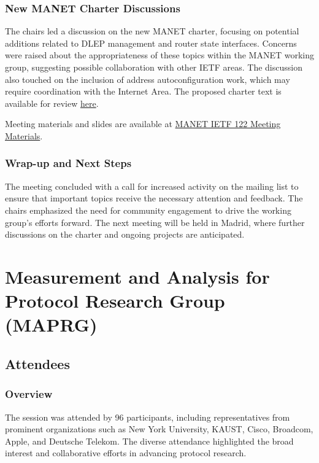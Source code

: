 \documentclass{article}
\begin{document}
\subsubsection{New MANET Charter Discussions}
The chairs led a discussion on the new MANET charter, focusing on potential additions related to DLEP management and router state interfaces. Concerns were raised about the appropriateness of these topics within the MANET working group, suggesting possible collaboration with other IETF areas. The discussion also touched on the inclusion of address autoconfiguration work, which may require coordination with the Internet Area. The proposed charter text is available for review \href{https://datatracker.ietf.org/meeting/122/materials/slides-122-manet-draft-charter-text-ietf-122-01}{here}.

Meeting materials and slides are available at \href{https://datatracker.ietf.org/meeting/122/materials/slides-122-manet-chair-slides-00}{MANET IETF 122 Meeting Materials}.

\subsubsection{Wrap-up and Next Steps}
The meeting concluded with a call for increased activity on the mailing list to ensure that important topics receive the necessary attention and feedback. The chairs emphasized the need for community engagement to drive the working group's efforts forward. The next meeting will be held in Madrid, where further discussions on the charter and ongoing projects are anticipated.



\newpage

\section{Measurement and Analysis for Protocol Research Group (MAPRG)}

\subsection{Attendees}
\subsubsection{Overview}
The session was attended by 96 participants, including representatives from prominent organizations such as New York University, KAUST, Cisco, Broadcom, Apple, and Deutsche Telekom. The diverse attendance highlighted the broad interest and collaborative efforts in advancing protocol research.
\end{document}
